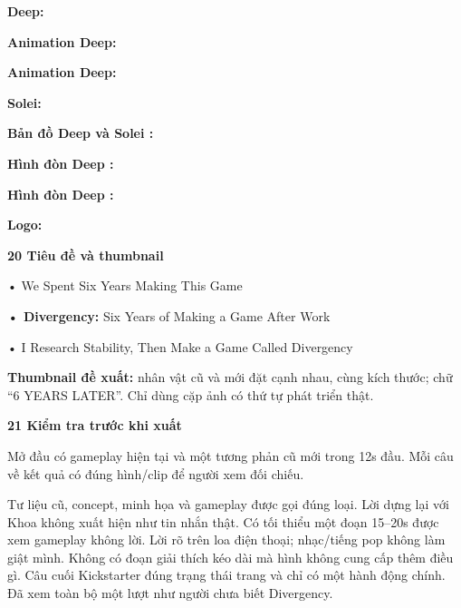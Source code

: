 \documentclass[10pt,a4paper]{article}
\begin{document}
\textbf{Deep:}  \par

\textbf{Animation Deep:}  \par

\textbf{Animation Deep:}  \par

\textbf{Solei:}  \par

\textbf{Bản đồ Deep và Solei :}  \par

\textbf{Hình đòn Deep :}  \par

\textbf{Hình đòn Deep :}  \par

\textbf{Logo:}  \par

\textbf{20 Tiêu đề và thumbnail}\par

• We Spent Six Years Making This Game\par

\textbf{• Divergency:}  Six Years of Making a Game After Work\par

• I Research Stability, Then Make a Game Called Divergency\par

\textbf{Thumbnail đề xuất:}  nhân vật cũ và mới đặt cạnh nhau, cùng kích thước; chữ “6 YEARS LATER”. Chỉ dùng cặp ảnh có thứ tự phát triển thật.\par

\clearpage

\textbf{21 Kiểm tra trước khi xuất}\par

Mở đầu có gameplay hiện tại và một tương phản cũ mới trong 12s đầu. Mỗi câu về kết quả có đúng hình/clip để người xem đối chiếu.\par

Tư liệu cũ, concept, minh họa và gameplay được gọi đúng loại. Lời dựng lại với Khoa không xuất hiện như tin nhắn thật. Có tối thiểu một đoạn 15–20s được xem gameplay không lời. Lời rõ trên loa điện thoại; nhạc/tiếng pop không làm giật mình. Không có đoạn giải thích kéo dài mà hình không cung cấp thêm điều gì. Câu cuối Kickstarter đúng trạng thái trang và chỉ có một hành động chính. Đã xem toàn bộ một lượt như người chưa biết Divergency.\par
\end{document}
